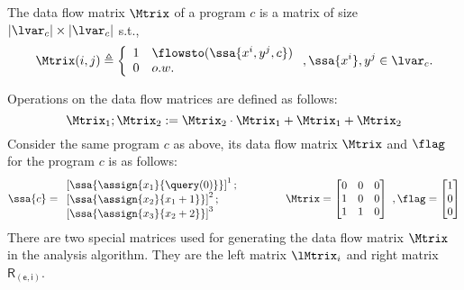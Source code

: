 %
%
\begin{defn}
The data flow matrix $\Mtrix$ of a program $c$ is a matrix of size $|\lvar_c| \times |\lvar_c|$ 
s.t.,
%
\[
\Mtrix(i, j) \triangleq
\left\{
\begin{array}{ll}
1	&	\flowsto(\ssa{x^i, y^j, c}) \\
0	& o.w.
\end{array}
\right., \ssa{x^i}, y^j  \in \lvar_c.
\]
%
\end{defn}
%
Operations on the data flow matrices are defined as follows:
%
\begin{equation}
\Mtrix_1 ; \Mtrix_2 
:= \Mtrix_2 \cdot \Mtrix_1 + \Mtrix_1 + \Mtrix_2
\end{equation}
%
Consider the same program $c$ as above, its data flow matrix $\Mtrix$ and $\flag$ for the program $c$ is as follows:
$$
\ssa{c} = 
\begin{array}{l}
\left[\ssa{\assign {x_1} {\query(0)}}	\right]^1;
\\
\left[\ssa{\assign {x_2} {x_1 + 1}}		\right]^2;
\\
\left[\ssa{\assign {x_3} {x_2 + 2}}		\right]^3
\end{array}
~~~~~~~~~~~~
\Mtrix
=  \left[ 
\begin{matrix}
0 & 0 & 0 \\
1 & 0 & 0 \\
1 & 1 & 0 \\
\end{matrix} \right] ~ , 
\flag = \left [ \begin{matrix}
1 \\
0 \\
0 \\
\end{matrix} \right ]
$$
%
There are two special matrices used for generating the data flow matrix $\Mtrix$ in the analysis algorithm. They are the left matrix $\lMtrix_i$ and right matrix $\mathsf{R_{(e, i)}}$.

